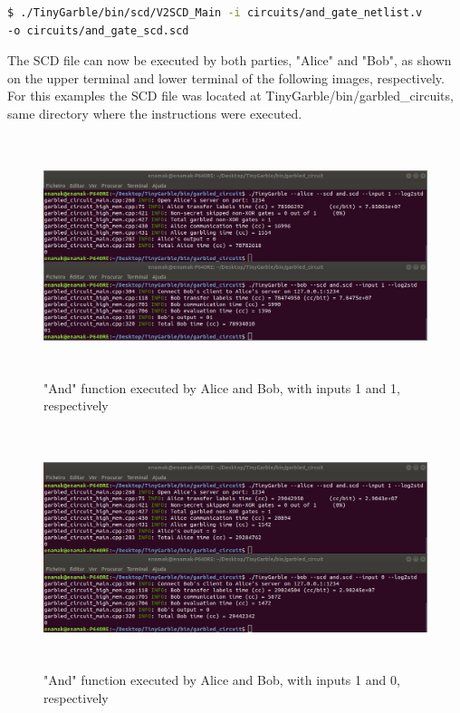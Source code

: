 \begin{refsection}
\begin{lstlisting}[caption={Installation of Yosys-abc}, language=bash, captionpos=b]
$ ./TinyGarble/bin/scd/V2SCD_Main -i circuits/and_gate_netlist.v
-o circuits/and_gate_scd.scd		
\end{lstlisting}

\newpage

The SCD file can now be executed by both parties, "Alice" and "Bob", as shown on the upper terminal and lower terminal of the following images, respectively.
For this examples the SCD file was located at TinyGarble/bin/garbled\_circuits, same directory where the instructions were executed.

\begin{figure}[H]
	\centering
	\includegraphics[width=1\textwidth, height=7cm]{./sdf/secure_multiparty_computation/figures/tinygarble_and_a.png}
    \caption{"And" function executed by Alice and Bob, with inputs 1 and 1, respectively}\label{fig:tinygarble_and_a}
\end{figure}

\begin{figure}[H]
	\centering
	\includegraphics[width=1\textwidth, height=7cm]{./sdf/secure_multiparty_computation/figures/tinygarble_and_b.png}
    \caption{"And" function executed by Alice and Bob, with inputs 1 and 0, respectively}\label{fig:tinygarble_and_b}
\end{figure}


\end{refsection}
